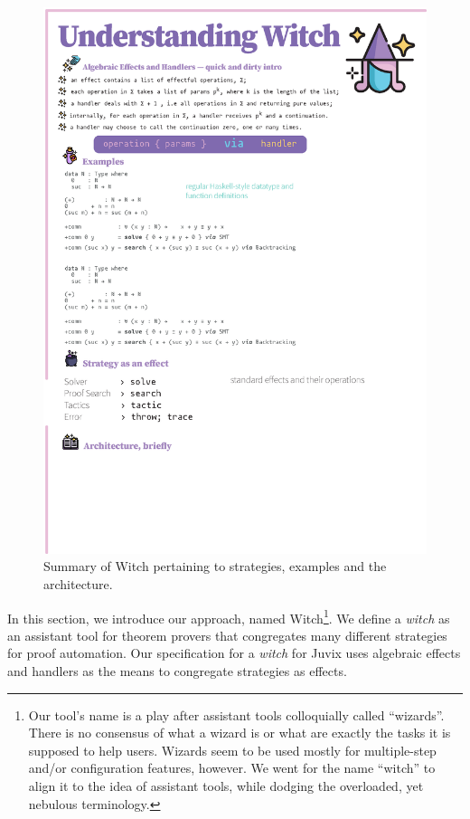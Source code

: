 \documentclass[sigconfl]{acmart}
\begin{document}
\begin{figure}[!ht]
   \centering
    \includegraphics[height=\textheight]{image/witch.eps}
    \caption{Summary of Witch pertaining to strategies, examples
      and the architecture.}
    \label{fig:prototype}
\end{figure}

In this section, we introduce our approach, named Witch\footnote{Our tool's name is
  a play after assistant tools colloquially called ``wizards''. There is no
  consensus of what a wizard is or what are exactly the tasks it is supposed
  to help users. Wizards seem to be used mostly for multiple-step and/or
  configuration features, however. We went for the name ``witch'' to align it to
the idea of assistant tools, while dodging the overloaded, yet nebulous
terminology.}. We define a \textit{witch} as an assistant tool for theorem
provers that congregates many different strategies for proof automation. Our
specification for a \textit{witch} for Juvix uses algebraic effects and handlers
as the means to congregate strategies as effects.
\end{document}
